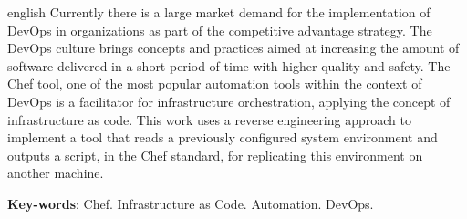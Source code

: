 \newpage\null\thispagestyle{empty}\newpage
\begin{resumo}[Abstract]
  \begin{otherlanguage*}{english}
    Currently there is a large market demand for the implementation
    of DevOps in organizations as part of the competitive advantage
    strategy. The DevOps culture brings concepts and practices aimed at increasing
    the amount of software delivered in a short period of time with higher quality
    and safety. The Chef tool, one of the most popular automation tools within the
    context of DevOps is a facilitator for infrastructure orchestration, applying
    the concept of infrastructure as code. This work uses a reverse engineering %
    approach to implement a tool that reads a previously configured system
    environment and outputs a script, in the Chef standard, for replicating this
    environment on another machine.

    \vspace{\onelineskip}
    \noindent 
    \textbf{Key-words}: Chef. Infrastructure as Code. Automation. DevOps.
  \end{otherlanguage*}
\end{resumo}
